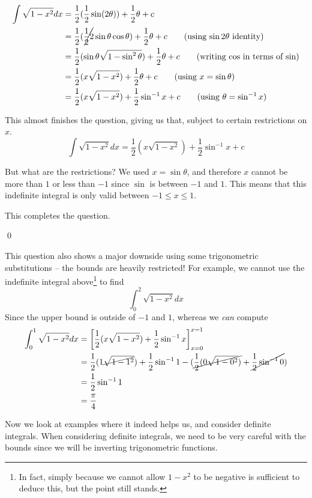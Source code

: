 \begin{solution}
    \begin{align*}
        \int \sqrt{1 - x^2} dx &= \frac{1}{2}(\frac{1}{2}\sin(2\theta))+  \frac{1}{2}\theta + c \\
         &=  \frac{1}{2}(\cancel{\frac{1}{2}2} \sin \theta \cos \theta)+  \frac{1}{2}\theta + c \tag{using $\sin 2 \theta$ identity}\\
         &= \frac{1}{2}( \sin \theta  \sqrt{1 - \sin^2 \theta})+  \frac{1}{2}\theta + c \tag{writing $\cos$ in terms of $\sin$}\\
         &= \frac{1}{2}( x \sqrt{1 - x^2})+  \frac{1}{2}\theta + c  \tag{using $x = \sin \theta$}\\
         &= \frac{1}{2}( x \sqrt{1 - x^2})+  \frac{1}{2}\sin^{-1} x + c  \tag{using $\theta = \sin^{-1} x$}
    \end{align*}

    This almost finishes the question, giving us that, subject to certain restrictions on $x$.
    \[ \int \sqrt{1 - x^2} dx  = \frac{1}{2}( x \sqrt{1 - x^2})+  \frac{1}{2}\sin^{-1} x + c \]

    But what are the restrictions? We used $x = \sin\theta$, and therefore $x$ cannot be more than $1$ or less than $-1$ since $\sin$ is between $-1$ and $1$.
    This means that this indefinite integral is only valid between $-1 \leq x \leq 1$.

    This completes the question.

    \qed
\end{solution}
This question also shows a major downside using some trigonometric substitutions -- the bounds are heavily restricted! For example, we cannot use the indefinite integral above\footnote{In fact, simply because we cannot allow $1-x^2$ to be negative is sufficient to deduce this, but the point still stands.} to find 
\[ \int_0^2 \sqrt{1 - x^2} dx\] 
Since the upper bound is outside of $-1$ and $1$, whereas we \emph{can} compute
\begin{align*}
    \int_0^1 \sqrt{1 - x^2} dx &= \left[\frac{1}{2}( x \sqrt{1 - x^2})+  \frac{1}{2}\sin^{-1} x \right]_{x=0}^{x=1} \\
    &= \frac{1}{2}( 1 \cancel{\sqrt{1 - 1^2}})+  \frac{1}{2}\sin^{-1} 1  - (\cancel{\frac{1}{2}( 0 \sqrt{1 - 0^2})}+  \cancel{\frac{1}{2}\sin^{-1} 0}) \\
    &= \frac{1}{2}\sin^{-1} 1  \\
    &= \frac{\pi}{4}
\end{align*}

Now we look at examples where it indeed helps us, and consider definite integrals. When considering definite integrals, we need to be very careful with the bounds since we will be inverting trigonometric functions.

